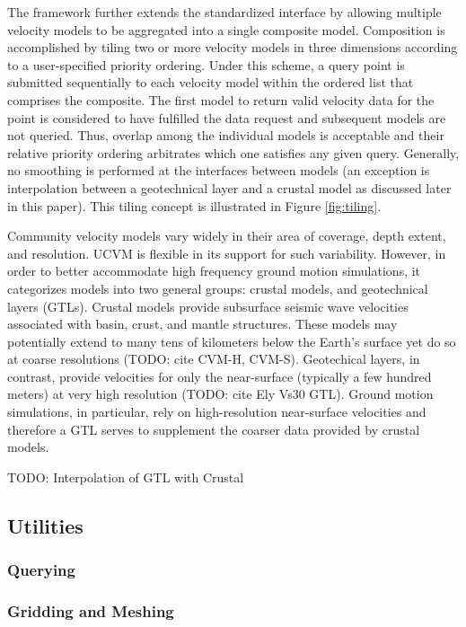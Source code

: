The framework further extends the standardized interface by allowing multiple velocity models to be aggregated into a single composite model. Composition is accomplished by tiling two or more velocity models in three dimensions according to a user-specified priority ordering. Under this scheme, a query point is submitted sequentially to each velocity model within the ordered list that comprises the composite. The first model to return valid velocity data for the point is considered to have fulfilled the data request and subsequent models are not queried. Thus, overlap among the individual models is acceptable and their relative priority ordering arbitrates which one satisfies any given query. Generally, no smoothing is performed at the interfaces between models (an exception is interpolation between a geotechnical layer and a crustal model as discussed later in this paper). This tiling concept is illustrated in Figure \ref{fig:tiling}.

Community velocity models vary widely in their area of coverage, depth extent, and resolution. UCVM is flexible in its support for such variability. However, in order to better accommodate high frequency ground motion simulations, it categorizes models into two general groups: crustal models, and geotechnical layers (GTLs). Crustal models provide subsurface seismic wave velocities associated with basin, crust, and mantle structures. These models may potentially extend to many tens of kilometers below the Earth's surface yet do so at coarse resolutions (TODO: cite CVM-H, CVM-S). Geotechical layers, in contrast, provide velocities for only the near-surface (typically a few hundred meters) at very high resolution (TODO: cite Ely Vs30 GTL). Ground motion simulations, in particular, rely on high-resolution near-surface velocities and therefore a GTL serves to supplement the coarser data provided by crustal models.

TODO: Interpolation of GTL with Crustal

\subsection{Utilities}

\subsubsection{Querying}

\subsubsection{Gridding and Meshing}

